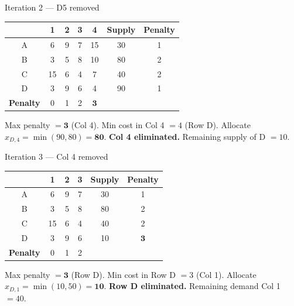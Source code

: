 \documentclass[12pt]{article}
\begin{document}
\vspace{6pt}

\begin{iterbox}{Iteration 2 — D5 removed}
\begin{center}
\renewcommand{\arraystretch}{1.25}
\begin{tabular}{|c|c|c|c|c|c|c|}
  \hline
  \rowcolor{primary}
  & {\color{white}\textbf{1}} & {\color{white}\textbf{2}} &
    {\color{white}\textbf{3}} & {\color{white}\textbf{4}} &
    {\color{white}\textbf{Supply}} & {\color{white}\textbf{Penalty}} \\
  \hline
  A & 6 & 9 & 7 & 15 & 30 & 1 \\
  \hline
  B & 3 & 5 & 8 & 10 & 80 & 2 \\
  \hline
  C & 15 & 6 & 4 & 7 & 40 & 2 \\
  \hline
  D & 3 & 9 & 6 & 4 & 90 & 1 \\
  \hline
  \rowcolor{accent!15}
  \textbf{Penalty} & 0 & 1 & 2 & \cellcolor{gold!40}$\mathbf{3}$ & & \\
  \hline
\end{tabular}
\end{center}
Max penalty $= \mathbf{3}$ (Col 4). Min cost in Col 4 $= 4$ (Row D).
Allocate $x_{D,4} = \min(90,80) = \mathbf{80}$. \textbf{Col 4 eliminated.} Remaining supply of D $= 10$.
\end{iterbox}

\vspace{6pt}

\begin{iterbox}{Iteration 3 — Col 4 removed}
\begin{center}
\renewcommand{\arraystretch}{1.25}
\begin{tabular}{|c|c|c|c|c|c|}
  \hline
  \rowcolor{primary}
  & {\color{white}\textbf{1}} & {\color{white}\textbf{2}} &
    {\color{white}\textbf{3}} & {\color{white}\textbf{Supply}} & {\color{white}\textbf{Penalty}} \\
  \hline
  A & 6 & 9 & 7 & 30 & 1 \\
  \hline
  B & 3 & 5 & 8 & 80 & 2 \\
  \hline
  C & 15 & 6 & 4 & 40 & 2 \\
  \hline
  \rowcolor{gold!25} D & 3 & 9 & 6 & 10 & $\mathbf{3}$ \\
  \hline
  \rowcolor{accent!15}
  \textbf{Penalty} & 0 & 1 & 2 & & \\
  \hline
\end{tabular}
\end{center}
Max penalty $= \mathbf{3}$ (Row D). Min cost in Row D $= 3$ (Col 1).
Allocate $x_{D,1} = \min(10,50) = \mathbf{10}$. \textbf{Row D eliminated.} Remaining demand Col 1 $= 40$.
\end{iterbox}
\end{document}
